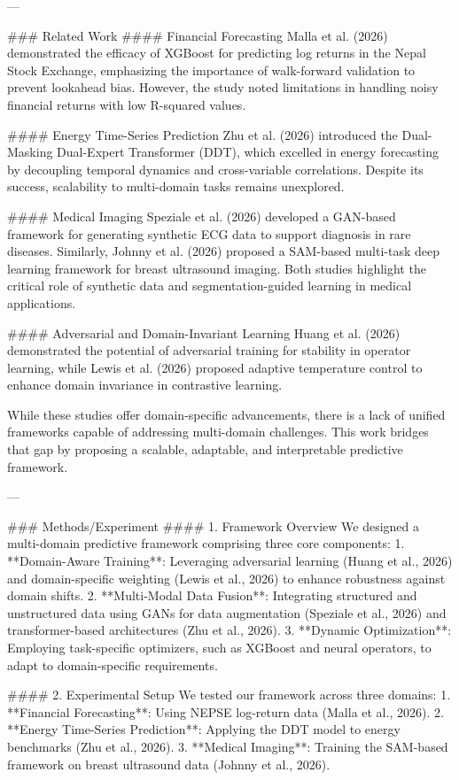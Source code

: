 ---

### Related Work
#### Financial Forecasting
Malla et al. (2026) demonstrated the efficacy of XGBoost for predicting log returns in the Nepal Stock Exchange, emphasizing the importance of walk-forward validation to prevent lookahead bias. However, the study noted limitations in handling noisy financial returns with low R-squared values.

#### Energy Time-Series Prediction
Zhu et al. (2026) introduced the Dual-Masking Dual-Expert Transformer (DDT), which excelled in energy forecasting by decoupling temporal dynamics and cross-variable correlations. Despite its success, scalability to multi-domain tasks remains unexplored.

#### Medical Imaging
Speziale et al. (2026) developed a GAN-based framework for generating synthetic ECG data to support diagnosis in rare diseases. Similarly, Johnny et al. (2026) proposed a SAM-based multi-task deep learning framework for breast ultrasound imaging. Both studies highlight the critical role of synthetic data and segmentation-guided learning in medical applications.

#### Adversarial and Domain-Invariant Learning
Huang et al. (2026) demonstrated the potential of adversarial training for stability in operator learning, while Lewis et al. (2026) proposed adaptive temperature control to enhance domain invariance in contrastive learning.

While these studies offer domain-specific advancements, there is a lack of unified frameworks capable of addressing multi-domain challenges. This work bridges that gap by proposing a scalable, adaptable, and interpretable predictive framework.

---

### Methods/Experiment
#### 1. Framework Overview
We designed a multi-domain predictive framework comprising three core components:
1. **Domain-Aware Training**: Leveraging adversarial learning (Huang et al., 2026) and domain-specific weighting (Lewis et al., 2026) to enhance robustness against domain shifts.
2. **Multi-Modal Data Fusion**: Integrating structured and unstructured data using GANs for data augmentation (Speziale et al., 2026) and transformer-based architectures (Zhu et al., 2026).
3. **Dynamic Optimization**: Employing task-specific optimizers, such as XGBoost and neural operators, to adapt to domain-specific requirements.

#### 2. Experimental Setup
We tested our framework across three domains:
1. **Financial Forecasting**: Using NEPSE log-return data (Malla et al., 2026).
2. **Energy Time-Series Prediction**: Applying the DDT model to energy benchmarks (Zhu et al., 2026).
3. **Medical Imaging**: Training the SAM-based framework on breast ultrasound data (Johnny et al., 2026).

